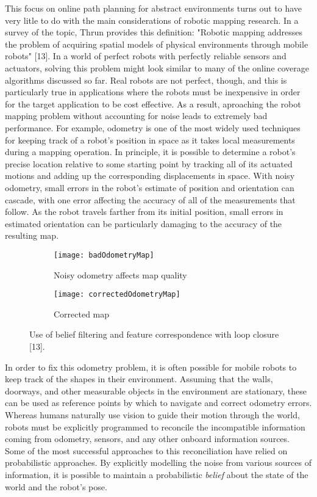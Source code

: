 This focus on online path planning for abstract environments turns out to have very litle to do with the main considerations of robotic mapping research. In a survey of the topic, Thrun provides this definition: "Robotic mapping addresses the problem of acquiring spatial models of physical environments through mobile robots" [13]. In a world of perfect robots with perfectly reliable sensors and actuators, solving this problem might look similar to many of the online coverage algorithms discussed so far. Real robots are not perfect, though, and this is particularly true in applications where the robots must be inexpensive in order for the target application to be cost effective. As a result, aproaching the robot mapping problem without accounting for noise leads to extremely bad performance. For example, odometry is one of the most widely used techniques for keeping track of a robot's position in space as it takes local measurements during a mapping operation. In principle, it is possible to determine a robot's precise location relative to some starting point by tracking all of its actuated motions and adding up the corresponding displacements in space. With noisy odometry, small errors in the robot's estimate of position and orientation can cascade, with one error affecting the accuracy of all of the measurements that follow. As the robot travels farther from its initial position, small errors in estimated orientation can be particularly damaging to the accuracy of the resulting map.

\begin{figure}[H]
\begin{subfigure}{.5\textwidth}
  \centering
  \texttt{[image: badOdometryMap]}
  \caption{Noisy odometry affects map quality}
\end{subfigure}
\begin{subfigure}{.5\textwidth}
  \centering
  \texttt{[image: correctedOdometryMap]}
  \caption{Corrected map}
\end{subfigure}
\caption[Odometry Errors and Corrected Map]{Use of belief filtering and feature correspondence with loop closure [13].}
\end{figure}

In order to fix this odometry problem, it is often possible for mobile robots to keep track of the shapes in their environment. Assuming that the walls, doorways, and other measurable objects in the environment are stationary, these can be used as reference points by which to navigate and correct odometry errors. Whereas humans naturally use vision to guide their motion through the world, robots must be explicitly programmed to reconcile the incompatible information coming from odometry, sensors, and any other onboard information sources. Some of the most successful approaches to this reconciliation have relied on probabilistic approaches. By explicitly modelling the noise from various sources of information, it is possible to maintain a probabilistic \textit{belief} about the state of the world and the robot's pose.

